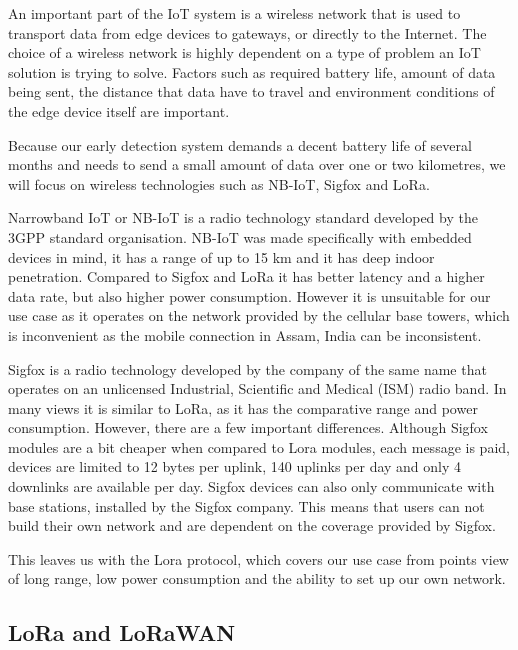 An important part of the IoT system is a wireless network that is used to transport data from edge devices to gateways, or directly to the Internet.
The choice of a wireless network is highly dependent on a type of problem an IoT solution is trying to solve.
Factors such as required battery life, amount of data being sent, the distance that data have to travel and environment conditions of the edge device itself are important.

Because our early detection system demands a decent battery life of several months and needs to send a small amount of data over one or two kilometres, we will focus on wireless technologies such as NB-IoT, Sigfox and LoRa.

Narrowband IoT or NB-IoT is a radio technology standard developed by the 3GPP standard organisation\cite{lora_nbiot}.
NB-IoT was made specifically with embedded devices in mind, it has a range of up to 15 \si{\kilo\meter} and it has deep indoor penetration\cite{lora_nbiot}.
Compared to Sigfox and LoRa it has better latency and a higher data rate, but also higher power consumption\cite{lora_nbiot_sigfox}.
However it is unsuitable for our use case as it operates on the network provided by the cellular base towers, which is inconvenient as the mobile connection in Assam, India can be inconsistent\cite{wildlabs-elephants}.

Sigfox is a radio technology developed by the company of the same name that operates on an unlicensed Industrial, Scientific and Medical (ISM) radio band.
In many views it is similar to LoRa, as it has the comparative range and power consumption\cite{lora_nbiot_sigfox}.
However, there are a few important differences.
Although Sigfox modules are a bit cheaper when compared to Lora modules, each message is paid, devices are limited to 12 bytes per uplink, 140 uplinks per day and only 4 downlinks are available per day.
Sigfox devices can also only communicate with base stations, installed by the Sigfox company\cite{lora_nbiot_sigfox}.
This means that users can not build their own network and are dependent on the coverage provided by Sigfox.

This leaves us with the Lora protocol, which covers our use case from points view of long range, low power consumption and the ability to set up our own network. 


\subsection{ LoRa and LoRaWAN}

